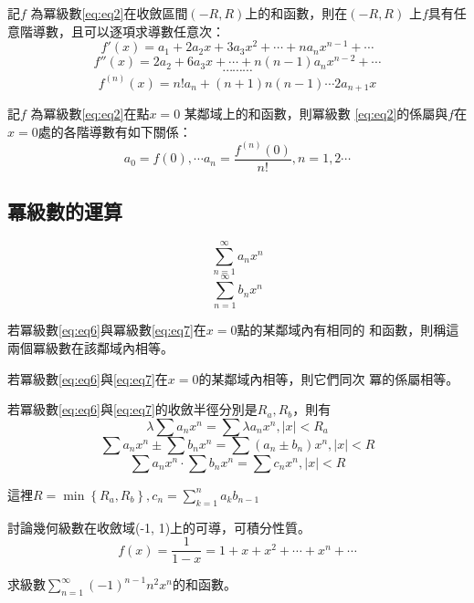 \documentclass[a4paper,12pt]{article}
\begin{document}
\begin{CJK*}{UTF8}{bsmi}
\begin{corollary}
    記$f$ 為冪級數\ref{eq:eq2}在收斂區間$(-R, R)$上的和函數，則在$(-R, R)$
    上$f$具有任意階導數，且可以逐項求導數任意次：
    \[
        f'(x) = a_1 + 2a_2x + 3a_3x^2 + \cdots + na_nx^{n-1} + \cdots
    \]
    \[
        f''(x) = 2a_2 + 6a_3x + \cdots + n(n-1)a_nx^{n-2} + \cdots
    \]
    \[
        \cdots\cdots\cdots
    \]
    \[
        f^{(n)}(x) = n!a_n + (n+1)n(n-1)\cdots 2 a_{n+1}x
    \]
\end{corollary}
\begin{corollary}
    記$f$ 為冪級數\ref{eq:eq2}在點$x = 0$ 某鄰域上的和函數，則冪級數
    \ref{eq:eq2}的係屬與$f$在$x = 0$處的各階導數有如下關係：
    \[
        a_0 = f(0), \cdots a_n = \frac{f^{(n)}(0)}{n!}, n=1,2 \cdots
    \]
\end{corollary}

\subsection{冪級數的運算}
\begin{equation}
    \sum_{n=1}^{\infty}a_nx^n
    \label{eq:eq6}
\end{equation}
\begin{equation}
    \sum_{n=1}^{\infty}b_nx^n
    \label{eq:eq7}
\end{equation}

\begin{definition}
    若冪級數\ref{eq:eq6}與冪級數\ref{eq:eq7}在$x=0$點的某鄰域內有相同的
    和函數，則稱這兩個冪級數在該鄰域內相等。
\end{definition}

\begin{theorem}
    若冪級數\ref{eq:eq6}與\ref{eq:eq7}在$x = 0$的某鄰域內相等，則它們同次
    冪的係屬相等。
\end{theorem}

\begin{theorem}
    若冪級數\ref{eq:eq6}與\ref{eq:eq7}的收斂半徑分別是$R_a, R_b$，則有
    \[
        \lambda\sum a_n x^n = \sum \lambda a_nx^n, \vert x \vert < R_a
    \]
    \[
        \sum a_n x^n \pm \sum b_n x^n = \sum (a_n \pm b_n)x^n, \vert x \vert < R
    \]
    \[
        \sum a_n x^n \cdot \sum b_n x^n = \sum c_n x^n, \vert x \vert < R
    \]

    這裡$\displaystyle R = \min\left\{R_a, R_b\right\}, c_n = \sum_{k=1}^{n}a_k b_{n-1}$

\end{theorem}

\begin{example}
    討論幾何級數在收斂域(-1, 1)上的可導，可積分性質。
    \[
        f(x) = \frac{1}{1-x} = 1 + x + x^2 + \cdots + x^n + \cdots
    \]
\end{example}

\begin{example}
    求級數$\displaystyle \sum_{n=1}^{\infty} (-1)^{n-1}n^2x^n$的和函數。
\end{example}
\end{CJK*}
\end{document}
